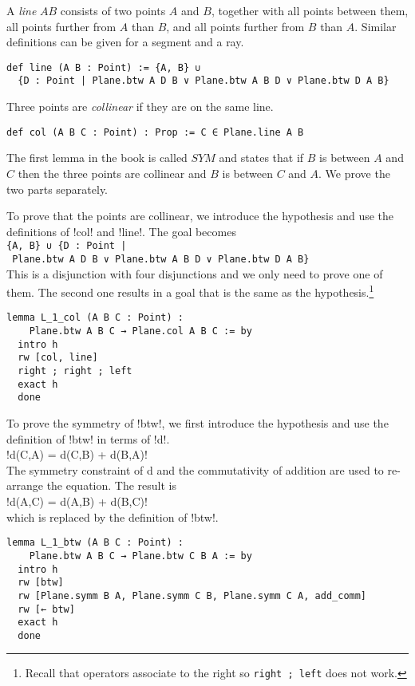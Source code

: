 A \emph{line} $AB$ consists of two points $A$ and $B$, together with all points between them, all points further from $A$ than $B$, and all points further from $B$ than $A$. Similar definitions can be given for a segment and a ray.

\begin{Verbatim}[firstnumber=last]
def line (A B : Point) := {A, B} ∪ 
  {D : Point | Plane.btw A D B ∨ Plane.btw A B D ∨ Plane.btw D A B}
\end{Verbatim}

Three points are \emph{collinear} if they are on the same line.

\begin{Verbatim}[firstnumber=last]
def col (A B C : Point) : Prop := C ∈ Plane.line A B
\end{Verbatim}

The first lemma in the book is called $SYM$ and states that if $B$ is between $A$ and $C$ then the three points are collinear and $B$ is between $C$ and $A$. We prove the two parts separately.

To prove that the points are collinear, we introduce the hypothesis and use the definitions of !col! and !line!. The goal becomes\\
\indnt{}\Verb+{A, B} ∪ {D : Point |+\\
\indnt{}\indnt{}\Verb+ Plane.btw A D B ∨ Plane.btw A B D ∨ Plane.btw D A B}+\\
This is a disjunction with four disjunctions and we only need to prove one of them. The second one results in a goal that is the same as the hypothesis.\footnote{Recall that operators associate to the right so \Verb+right ; left+ does not work.}
\begin{Verbatim}[firstnumber=last]
lemma L_1_col (A B C : Point) : 
    Plane.btw A B C → Plane.col A B C := by
  intro h
  rw [col, line]
  right ; right ; left
  exact h
  done
\end{Verbatim}

To prove the symmetry of !btw!, we first introduce the hypothesis and use the definition of !btw! in terms of !d!. \\
\indnt{}!d(C,A) = d(C,B) + d(B,A)!\\
The symmetry constraint of d and the commutativity of addition are used to re-arrange the equation. The result is\\
\indnt{}!d(A,C) = d(A,B) + d(B,C)!\\
which is replaced by the definition of !btw!.
\begin{Verbatim}[firstnumber=last]
lemma L_1_btw (A B C : Point) :
    Plane.btw A B C → Plane.btw C B A := by
  intro h
  rw [btw]
  rw [Plane.symm B A, Plane.symm C B, Plane.symm C A, add_comm]
  rw [← btw]
  exact h
  done
\end{Verbatim}

